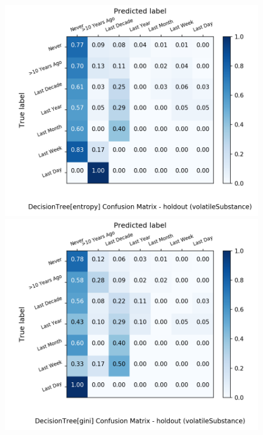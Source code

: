 \begin{figure}[H]
	\centering
	\begin{minipage}[b]{0.32\textwidth}
		\includegraphics[width=1.1\textwidth]{Plots/volatileSubstance_DecisionTree_entropy_balance_False_holdout.png}
	\end{minipage}
	\begin{minipage}[b]{0.32\textwidth}
		\includegraphics[width=1.1\textwidth]{Plots/volatileSubstance_DecisionTree_gini_balance_False_holdout.png}
	\end{minipage}

\end{figure}
